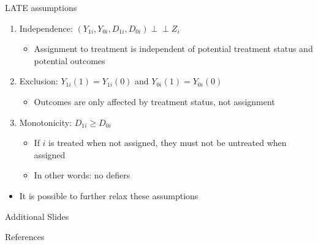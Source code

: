 \documentclass[aspectratio=169,compress,handout,t,xcolor=table]{beamer}
\providecommand{\indep}{\perp \!\!\!\! \perp}              %
\begin{document}
\begin{frame}{LATE assumptions}
  \begin{enumerate}
    \item Independence: \((Y_{1i}, Y_{0i}, D_{1i}, D_{0i}) \indep Z_i\)
    \begin{itemize}
      \item Assignment to treatment is independent of potential treatment status and potential outcomes
    \end{itemize}
    \item Exclusion: \(Y_{1i} (1) = Y_{1i} (0)\) and \(Y_{0i} (1) = Y_{0i} (0)\)
    \begin{itemize}
      \item Outcomes are only affected by treatment status, not assignment
    \end{itemize}
    \item Monotonicity: \(D_{1i} \geq D_{0i}\)
    \begin{itemize}
      \item If \(i\) is treated when not assigned, they must not be untreated when assigned
      \item In other words: no defiers
    \end{itemize}
  \end{enumerate}
  \begin{itemize}
    \item It is possible to further relax these assumptions 
  \end{itemize}
\end{frame}


\appendix
\begin{frame}[plain,c]
  \centerline{\Large{{ Additional Slides}}}
\end{frame}
\addtocounter{framenumber}{-1}
\begin{frame}[allowframebreaks]{References}
  
  \linespread{1}
  \begin{footnotesize}
  
  \end{footnotesize}
\end{frame}
\end{document}
